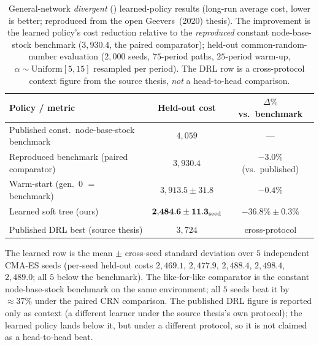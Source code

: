 \documentclass[11pt]{article}
\begin{document}
\begin{table}[!htbp]
\centering
\caption{General-network \emph{divergent} (\citealp{kunnumkal2011}) learned-policy results (long-run
average cost, lower is better; reproduced from the open Geevers~(2020) thesis). The
improvement is the learned policy's cost reduction relative to the \emph{reproduced} constant
node-base-stock benchmark ($3{,}930.4$, the paired comparator); held-out common-random-number evaluation
($2{,}000$ seeds, $75$-period paths, $25$-period warm-up, $\alpha\sim\mathrm{Uniform}[5,15]$ resampled
per period). The DRL row is a cross-protocol context figure from the source thesis, \emph{not} a
head-to-head comparison.}
\label{tab:divergent-kt-results}
\begin{tabular}{lcc}
\toprule
Policy / metric & Held-out cost & $\Delta\%$ vs.\ benchmark \\
\midrule
Published const.\ node-base-stock benchmark & $4{,}059$ & --- \\
Reproduced benchmark (paired comparator) & $3{,}930.4$ & $-3.0\%$ (vs.\ published) \\
Warm-start (gen.\ 0 $=$ benchmark) & $3{,}913.5 \pm 31.8$ & $-0.4\%$ \\
Learned soft tree (ours) & $\mathbf{2{,}484.6 \pm 11.3_{\rm seed}}$ & $\mathbf{-36.8\%\pm0.3\%}$ \\
\addlinespace[2pt]
\multicolumn{3}{l}{\footnotesize Cross-protocol context (not head-to-head):} \\
Published DRL best (source thesis) & $3{,}724$ & cross-protocol \\
\bottomrule
\end{tabular}
\par\medskip\footnotesize The learned row is the mean $\pm$ cross-seed standard deviation over $5$
independent CMA-ES seeds (per-seed held-out costs $2{,}469.1$, $2{,}477.9$, $2{,}488.4$, $2{,}498.4$,
$2{,}489.0$; all $5$ below the benchmark). The like-for-like comparator is the constant node-base-stock
benchmark on the same environment; all $5$ seeds beat it by $\approx 37\%$ under the paired CRN
comparison. The published DRL figure is reported only as context (a different learner under
the source thesis's own protocol); the learned policy lands below it, but under a different protocol,
so it is not claimed as a head-to-head beat.
\end{table}
\FloatBarrier


%
\end{document}
